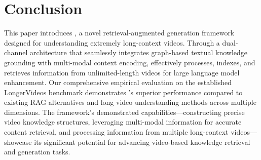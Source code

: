 \section{Conclusion}

This paper introduces \model, a novel retrieval-augmented generation framework designed for understanding extremely long-context videos. Through a dual-channel architecture that seamlessly integrates graph-based textual knowledge grounding with multi-modal context encoding, \model effectively processes, indexes, and retrieves information from unlimited-length videos for large language model enhancement. Our comprehensive empirical evaluation on the established LongerVideos benchmark demonstrates \model's superior performance compared to existing RAG alternatives and long video understanding methods across multiple dimensions. The framework's demonstrated capabilities—constructing precise video knowledge structures, leveraging multi-modal information for accurate content retrieval, and processing information from multiple long-context videos—showcase its significant potential for advancing video-based knowledge retrieval and generation tasks.